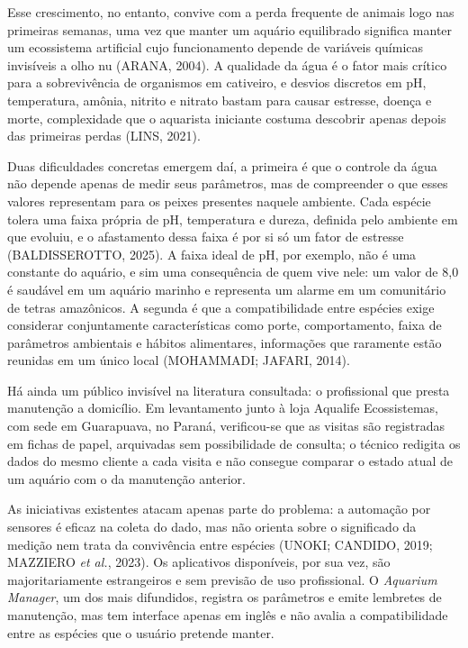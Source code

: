 \documentclass[12pt,oneside,a4paper,brazilian]{abntex2}
\begin{document}
Esse crescimento, no entanto, convive com a perda frequente de animais logo nas primeiras semanas, uma vez que manter um aquário equilibrado significa manter um ecossistema artificial cujo funcionamento depende de variáveis químicas invisíveis a olho nu (ARANA, 2004). A qualidade da água é o fator mais crítico para a sobrevivência de organismos em cativeiro, e desvios discretos em pH, temperatura, amônia, nitrito e nitrato bastam para causar estresse, doença e morte, complexidade que o aquarista iniciante costuma descobrir apenas depois das primeiras perdas (LINS, 2021).

Duas dificuldades concretas emergem daí, a primeira é que o controle da água não depende apenas de medir seus parâmetros, mas de compreender o que esses valores representam para os peixes presentes naquele ambiente. Cada espécie tolera uma faixa própria de pH, temperatura e dureza, definida pelo ambiente em que evoluiu, e o afastamento dessa faixa é por si só um fator de estresse (BALDISSEROTTO, 2025). A faixa ideal de pH, por exemplo, não é uma constante do aquário, e sim uma consequência de quem vive nele: um valor de 8,0 é saudável em um aquário marinho e representa um alarme em um comunitário de tetras amazônicos. A segunda é que a compatibilidade entre espécies exige considerar conjuntamente características como porte, comportamento, faixa de parâmetros ambientais e hábitos alimentares, informações que raramente estão reunidas em um único local (MOHAMMADI; JAFARI, 2014).

Há ainda um público invisível na literatura consultada: o profissional que presta manutenção a domicílio. Em levantamento junto à loja Aqualife Ecossistemas, com sede em Guarapuava, no Paraná, verificou-se que as visitas são registradas em fichas de papel, arquivadas sem possibilidade de consulta; o técnico redigita os dados do mesmo cliente a cada visita e não consegue comparar o estado atual de um aquário com o da manutenção anterior.

As iniciativas existentes atacam apenas parte do problema: a automação por sensores é eficaz na coleta do dado, mas não orienta sobre o significado da medição nem trata da convivência entre espécies (UNOKI; CANDIDO, 2019; MAZZIERO \textit{et al.}, 2023). Os aplicativos disponíveis, por sua vez, são majoritariamente estrangeiros e sem previsão de uso profissional. O \textit{Aquarium Manager}, um dos mais difundidos, registra os parâmetros e emite lembretes de manutenção, mas tem interface apenas em inglês e não avalia a compatibilidade entre as espécies que o usuário pretende manter.
\end{document}
